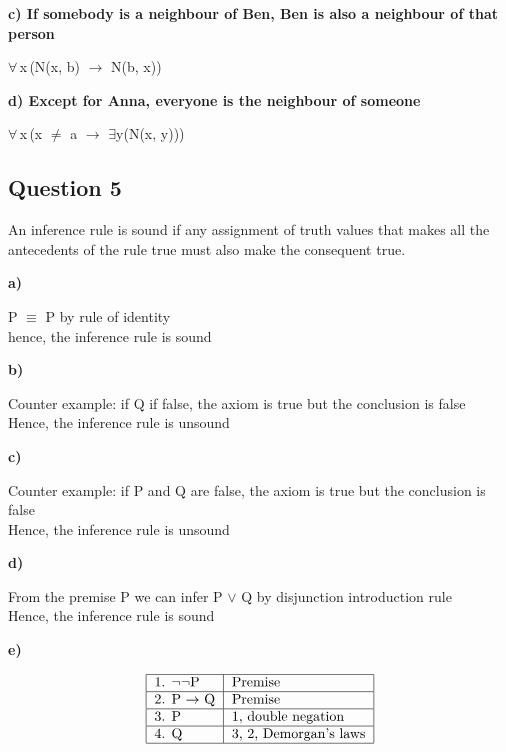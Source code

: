 \documentclass[11pt]{article}
\begin{document}
{\noindent
\textbf{c) If somebody is a neighbour of Ben, Ben is also a neighbour of that person}
\par\parindent 20pt
$\forall$\,x\,(N(x, b) $\rightarrow$ N(b, x))

\noindent
\textbf{d) Except for Anna, everyone is the neighbour of someone}
\par\parindent 20pt
$\forall$\,x\,(x $\neq$ a $\rightarrow$ $\exists$y(N(x, y)))

\subsection*{Question 5}
An inference rule is sound if any assignment of truth values that
makes all the antecedents of the rule true must also make the
consequent true.

\noindent
\textbf{a)} 

P $\equiv$ P by rule of identity\\
\indent
hence, the inference rule is sound
\parskip 6mm

\noindent
\textbf{b)} 

Counter example: if Q if false, the axiom is true but the conclusion is false\\
\indent
Hence, the inference rule is unsound

\noindent
\textbf{c)} 

Counter example: if P and Q are false, the axiom is true but the conclusion is false\\
\indent
Hence, the inference rule is unsound

\noindent
\textbf{d)} 

From the premise P we can infer P $\lor$ Q by disjunction introduction rule\\
\indent
Hence, the inference rule is sound

\noindent
\textbf{e)} 

\setlength{\tabcolsep}{1em} %
{\renewcommand{\arraystretch}{1.5}%
\begin{displaymath}
    \begin{tabular}{| l | l |}
        \hline
        1. $\neg$$\neg$P & Premise \\
        \hline
        2. P $\rightarrow$ Q & Premise \\
        \hline
        3. P & 1, double negation \\
        \hline
        4. Q & 3, 2, Demorgan's laws\\
        \hline
    \end{tabular}
\end{displaymath}

}}
\end{document}
